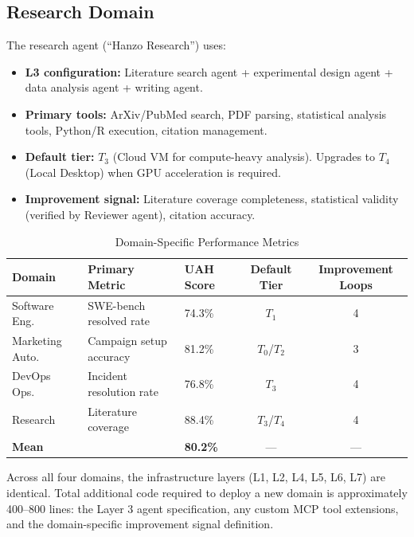 \documentclass[11pt]{article}
\begin{document}
\subsection{Research Domain}

The research agent (``Hanzo Research'') uses:
\begin{itemize}[leftmargin=1.5em]
    \item \textbf{L3 configuration:} Literature search agent + experimental
          design agent + data analysis agent + writing agent.
    \item \textbf{Primary tools:} ArXiv/PubMed search, PDF parsing, statistical
          analysis tools, Python/R execution, citation management.
    \item \textbf{Default tier:} $T_3$ (Cloud VM for compute-heavy analysis).
          Upgrades to $T_4$ (Local Desktop) when GPU acceleration is required.
    \item \textbf{Improvement signal:} Literature coverage completeness,
          statistical validity (verified by Reviewer agent), citation accuracy.
\end{itemize}

\begin{table}[H]
\centering
\caption{Domain-Specific Performance Metrics}
\label{tab:domains}
\begin{tabular}{lllcc}
\toprule
\textbf{Domain} & \textbf{Primary Metric} & \textbf{UAH Score} &
\textbf{Default Tier} & \textbf{Improvement Loops} \\
\midrule
Software Eng.    & SWE-bench resolved rate & 74.3\% & $T_1$ & 4 \\
Marketing Auto.  & Campaign setup accuracy & 81.2\% & $T_0$/$T_2$ & 3 \\
DevOps Ops.      & Incident resolution rate & 76.8\% & $T_3$ & 4 \\
Research         & Literature coverage      & 88.4\% & $T_3$/$T_4$ & 4 \\
\midrule
\multicolumn{2}{l}{\textbf{Mean}} & \textbf{80.2\%} & --- & --- \\
\bottomrule
\end{tabular}
\end{table}

Across all four domains, the infrastructure layers (L1, L2, L4, L5, L6, L7)
are identical. Total additional code required to deploy a new domain is
approximately 400--800 lines: the Layer 3 agent specification, any custom
MCP tool extensions, and the domain-specific improvement signal definition.
\end{document}
